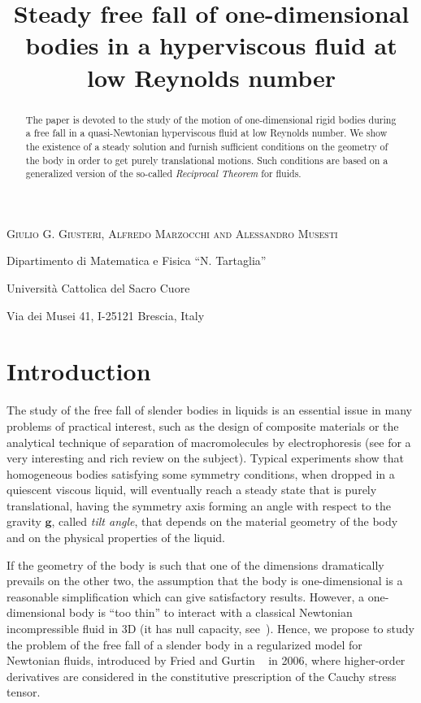 \documentclass[final]{amsart}
\title[Free fall of one-dimensional bodies] 
{Steady free fall of one-dimensional bodies in a
  hyperviscous fluid at low Reynolds number}
\author[G. G. Giusteri, A. Marzocchi and A. Musesti]{}
\theoremstyle{definition}
\theoremstyle{definition}
\theoremstyle{remark}
\begin{document}
\maketitle

\centerline{\scshape Giulio G. Giusteri, Alfredo Marzocchi and
  Alessandro Musesti }
\medskip
{\footnotesize
 \centerline{Dipartimento di Matematica e Fisica ``N. Tartaglia''}
   \centerline{Universit\`a Cattolica del Sacro Cuore}
   \centerline{Via dei Musei 41, I-25121 Brescia, Italy}
}
\bigskip

\begin{abstract}
  The paper is devoted to the study of the motion of one-dimensional
  rigid bodies during a free fall in a quasi-Newtonian hyperviscous
  fluid at low Reynolds number. We show the existence of a steady
  solution and furnish sufficient conditions on the geometry of the
  body in order to get purely translational motions. Such conditions
  are based on a generalized version of the so-called {\em Reciprocal
    Theorem} for fluids.
\end{abstract}

\section{Introduction}

The study of the free fall of slender bodies in liquids is an essential
issue in many problems of practical interest, such as the design of
composite materials or the analytical technique of separation of
macromolecules by electrophoresis (see \cite{Gal02} for a very
interesting and rich review on the subject). Typical experiments show
that homogeneous bodies satisfying some symmetry conditions, when
dropped in a quiescent viscous liquid, will eventually reach a steady
state that is purely translational, having the symmetry axis
forming an angle with respect to the gravity ${\boldsymbol g}$, called {\em tilt
  angle}, that depends on the material geometry of the body and on the
physical properties of the liquid.

If the geometry of the body is such that one of the dimensions
dramatically prevails on the other two, the assumption that the body
is one-dimensional is a reasonable simplification which can give
satisfactory results. However, a one-dimensional body is ``too thin''
to interact with a classical Newtonian incompressible fluid in 3D (it
has null capacity, see~\cite{Wei72}). Hence, we propose to study the
problem of the free fall of a slender body in a regularized model for
Newtonian fluids, introduced by Fried and Gurtin ~\cite{FriGur06} in
2006, where higher-order derivatives are considered in the
constitutive prescription of the Cauchy stress tensor.
\end{document}
